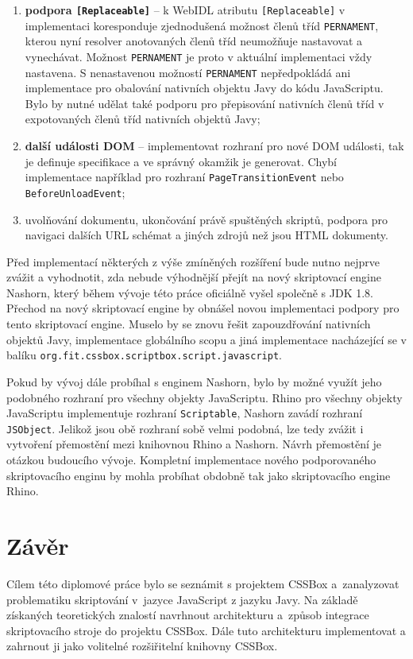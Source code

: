 \begin{enumerate}
  \item \textbf{podpora \texttt{[Replaceable]}} -- k WebIDL atributu \texttt{[Replaceable]} v implementaci koresponduje zjednodušená možnost členů tříd \texttt{PERNAMENT}, kterou nyní resolver anotovaných členů tříd neumožňuje nastavovat a vynechávat. Možnost \texttt{PERNAMENT} je proto v aktuální implementaci vždy nastavena. S nenastavenou možností \texttt{PERNAMENT} nepředpokládá ani implementace pro obalování nativních objektu Javy do kódu JavaScriptu. Bylo by nutné udělat také podporu pro přepisování nativních členů tříd v expotovaných členů tříd nativních objektů Javy;
  \item \textbf{další události DOM} -- implementovat rozhraní pro nové DOM události, tak je definuje specifikace a ve správný okamžik je generovat. Chybí implementace například pro rozhraní \texttt{PageTransitionEvent} nebo \texttt{BeforeUnloadEvent};
  \item uvolňování dokumentu, ukončování právě spuštěných skriptů, podpora pro navigaci dalších URL schémat a jiných zdrojů než jsou HTML dokumenty.
\end{enumerate}

Před implementací některých z výše zmíněných rozšíření bude nutno nejprve zvážit a vyhodnotit, zda nebude výhodnější přejít na nový skriptovací engine Nashorn, který během vývoje této práce oficiálně vyšel společně s JDK 1.8. Přechod na nový skriptovací engine by obnášel novou implementaci podpory pro tento skriptovací engine. Muselo by se znovu řešit zapouzdřování nativních objektů Javy, implementace globálního scopu a jiná implementace nacházející se v balíku \texttt{org.fit.cssbox.scriptbox.script.javascript}.

Pokud by vývoj dále probíhal s enginem Nashorn, bylo by možné využít jeho podobného rozhraní pro všechny objekty JavaScriptu. Rhino pro všechny objekty JavaScriptu implementuje rozhraní \texttt{Scriptable}, Nashorn zavádí rozhraní \texttt{JSObject}. Jelikož jsou obě rozhraní sobě velmi podobná, lze tedy zvážit i vytvoření přemostění mezi knihovnou Rhino a Nashorn. Návrh přemostění je otázkou budoucího vývoje. Kompletní implementace nového podporovaného skriptovacího enginu by mohla probíhat obdobně tak jako skriptovacího engine Rhino.

\chapter{Závěr}
\label{Chapter.Final}

Cílem této diplomové práce bylo se seznámit s projektem CSSBox a~zanalyzovat problematiku skriptování v~jazyce JavaScript z jazyku Javy. Na základě získaných teoretických znalostí navrhnout architekturu a~způsob integrace skriptovacího stroje do projektu CSSBox. Dále tuto architekturu implementovat a zahrnout ji jako volitelné rozšiřitelní knihovny CSSBox. 

